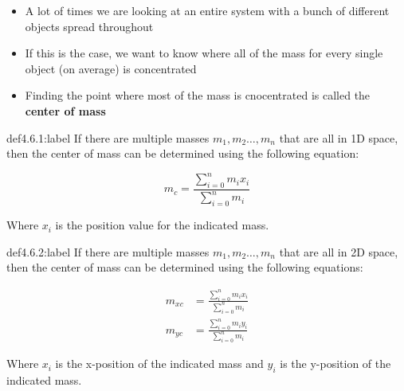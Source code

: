 \begin{itemize}
    \item A lot of times we are looking at an entire system with a bunch of different objects spread throughout
    \item If this is the case, we want to know where all of the mass for every single object (on average) is concentrated
    \item Finding the point where most of the mass is cnocentrated is called the \textbf{center of mass}
\end{itemize}

\begin{definition}{def4.6.1:label}
    If there are multiple masses $m_1,m_2\dots,m_n$ that are all in 1D space, then the center of mass can be determined using the following equation:

    \[
        m_{c} = \frac{\sum_{i=0}^n m_ix_i}{\sum_{i=0}^n m_i}    
    \]

    Where $x_i$ is the position value for the indicated mass.
\end{definition}


\newpage
\begin{definition}{def4.6.2:label}
    If there are multiple masses $m_1,m_2\dots,m_n$ that are all in 2D space, then the center of mass can be determined using the following equations:

    \[
        \begin{aligned}
            m_{xc} &= \frac{\sum_{i=0}^n m_ix_i}{\sum_{i=0}^n m_i}\\
            m_{yc} &= \frac{\sum_{i=0}^n m_iy_i}{\sum_{i=0}^n m_i} 
        \end{aligned}   
    \]

    Where $x_i$ is the x-position of the indicated mass and $y_i$ is the y-position of the indicated mass.
\end{definition}